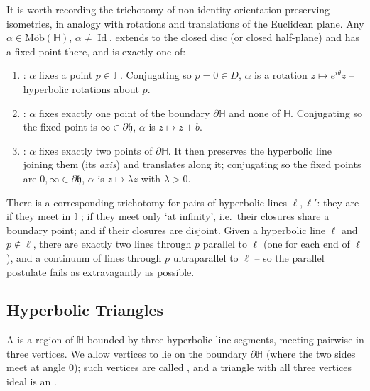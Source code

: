 \documentclass[a4paper]{scrartcl}
\newcommand{\Mob}{\text{M\"ob}}
\newcommand{\HH}{\mathbb{H}}
\begin{document}
It is worth recording the trichotomy of non-identity orientation-preserving isometries, in analogy with rotations and translations of the Euclidean plane. Any $\alpha \in \Mob(\HH)$, $\alpha \neq \operatorname{Id}$, extends to the closed disc (or closed half-plane) and has a fixed point there, and is exactly one of:
\begin{enumerate}[label=(\roman*)]
    \item {}: $\alpha$ fixes a point $p \in \HH$. Conjugating so $p = 0 \in D$, $\alpha$ is a rotation $z \mapsto e^{i\theta}z$ -- hyperbolic rotations about $p$.
    \item {}: $\alpha$ fixes exactly one point of the boundary $\partial \HH$ and none of $\HH$. Conjugating so the fixed point is $\infty \in \partial\mathfrak{h}$, $\alpha$ is $z \mapsto z + b$.
    \item {}: $\alpha$ fixes exactly two points of $\partial\HH$. It then preserves the hyperbolic line joining them (its \emph{axis}) and translates along it; conjugating so the fixed points are $0, \infty \in \partial\mathfrak{h}$, $\alpha$ is $z \mapsto \lambda z$ with $\lambda > 0$.
\end{enumerate}

There is a corresponding trichotomy for pairs of hyperbolic lines $\ell, \ell'$: they are  if they meet in $\HH$;  if they meet only `at infinity', i.e.\ their closures share a boundary point; and  if their closures are disjoint. Given a hyperbolic line $\ell$ and $p \notin \ell$, there are exactly two lines through $p$ parallel to $\ell$ (one for each end of $\ell$), and a continuum of lines through $p$ ultraparallel to $\ell$ -- so the parallel postulate fails as extravagantly as possible.

\subsection{Hyperbolic Triangles}

\begin{definition}
    A  is a region of $\HH$ bounded by three hyperbolic line segments, meeting pairwise in three vertices. We allow vertices to lie on the boundary $\partial\HH$ (where the two sides meet at angle $0$); such vertices are called , and a triangle with all three vertices ideal is an .
\end{definition}
\end{document}

